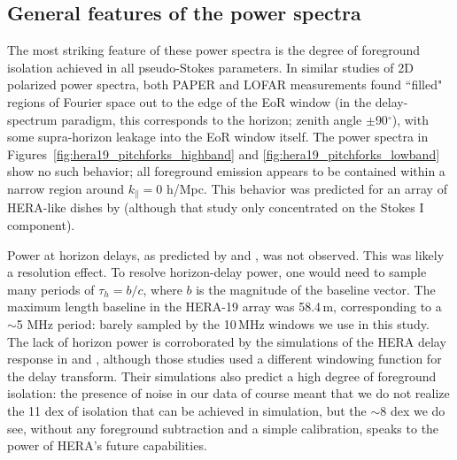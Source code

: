 \subsection{General features of the power spectra}
\label{subsec:general_features}
The most striking feature of these power spectra is the degree of foreground isolation achieved in all pseudo-Stokes parameters. In similar studies of 2D polarized power spectra, both PAPER \citep{Kohn.16} and LOFAR \citep{Asad.17} measurements found ``filled" regions of Fourier space out to the edge of the EoR window (in the delay-spectrum paradigm, this corresponds to the horizon; zenith angle $\pm$90$^{\circ}$), with some supra-horizon leakage \citep{Pober.13} into the EoR window itself. The power spectra in Figures~\ref{fig:hera19_pitchforks_highband} and \ref{fig:hera19_pitchforks_lowband} show no such behavior; all foreground emission appears to be contained within a narrow region around $k_{\parallel}=0$ h/Mpc. This behavior was predicted for an array of HERA-like dishes by \citealt{Nithya.15b} (although that study only concentrated on the Stokes I component). 

Power at horizon delays, as predicted by \cite{Nithya.15b} and \cite{Neben.16}, was not observed. This was likely a resolution effect. To resolve horizon-delay power, one would need to sample many periods of $\tau_h=b/c$, where $b$ is the magnitude of the baseline vector. The maximum length baseline in the HERA-19 array was 58.4\,m, corresponding to a $\sim$5 MHz period: barely sampled by the 10\,MHz windows we use in this study. The lack of horizon power is corroborated by the simulations of the HERA delay response in \cite{Ewall-Wice.16.HERA_Dish} and \cite{Thyagarajan.16}, although those studies used a different windowing function for the delay transform. Their simulations also predict a high degree of foreground isolation: the presence of noise in our data of course meant that we do not realize the 11 dex of isolation that can be achieved in simulation, but the $\sim$8 dex we do see, without any foreground subtraction and a simple calibration, speaks to the power of HERA's future capabilities.


